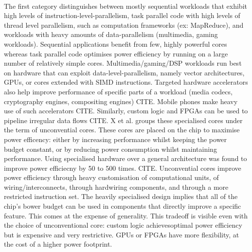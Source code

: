 \paragraph{} The first category distinguishes between mostly sequential workloads that
exhibit high levels of instruction-level-parallelism, task parallel code
with high levels of thread level parallelism, such as computation frameworks
(ex: MapReduce), and workloads with heavy amounts of data-parallelism (multimedia, gaming workloads). Sequential applications benefit from few, highly powerful cores whereas task parallel code optimises power efficiency by running on a large number of  relatively simple cores. Multimedia/gaming/DSP workloads run best on hardware that can exploit data-level-parallelism, namely vector architectures, GPUs, or cores extended with SIMD instructions. Targeted hardware accelerators also help improve performance of specific parts of a workload (media codecs, cryptography engines, compositing engines) CITE. Mobile phones make 
heavy use of such accelerators CITE. Similarly, custom logic and FPGAs can be used to pipeline irregular data flows CITE.
 X et al. groups these specialised cores under the term of unconvential cores. These cores are placed on the chip to maximise power efficency: 
either by increasing performance whilst keeping the power budget constant,
or by reducing power consumption whilst maintaining performance. Using specialised hardware over a general architecture was found to improve power efficiecny by 50 to 500 times. CITE. 
Unconvential cores improve power efficiency through heavy customisation of computational units, of wiring/interconnects, through hardwiring components, and through a more restricted instruction set. The heavily specialised design implies that all of the chip's bower budget can be used in components that directly improve a specific feature. This comes at the expense of generality. This tradeoff is visible even with the choice of unconventional core: custom logic achievesoptimal power efficiency but is expensive and very restrictive. GPUs or FPGAs have more flexibility, at the cost of a higher power footprint.  

